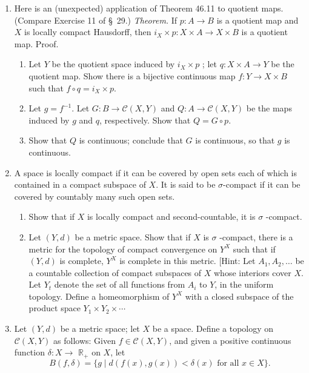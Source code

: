 \begin{enumerate}[itemsep=0.4em, parsep=0pt, topsep=0pt, partopsep=0pt, leftmargin=*, label=\arabic*., ref=\arabic*]
\item Here is an (unexpected) application of Theorem 46.11 to quotient maps. (Compare Exercise 11 of \S\ 29.) \textsl{Theorem.} If \(p : A \rightarrow B\) is a quotient map and \(X\) is locally compact Hausdorff, then \(i_{X} \times p : X \times A \rightarrow X \times B\) is a quotient map. Proof.
 \begin{enumerate}[itemsep=0.2em, parsep=0pt, topsep=0pt, partopsep=0pt, leftmargin=*, label=(\alph*), align=left]
 \item Let \(Y\) be the quotient space induced by \(i_{X} \times p\) ; let \(q : X \times A \rightarrow Y\) be the quotient map. Show there is a bijective continuous map \(f : Y \rightarrow X \times B\) such that \(f \circ q = i_{X} \times p\).
 \item Let \(g = f^{-1}\). Let \(G : B \rightarrow \mathcal{C}({X,Y})\) and \(Q : A \rightarrow \mathcal{C}({X,Y})\) be the maps induced by \(g\) and \(q\), respectively. Show that \(Q = G \circ p\).
 \item Show that \(Q\) is continuous; conclude that \(G\) is continuous, so that \(g\) is continuous.
 \end{enumerate}
\item[*10.] A space is locally compact if it can be covered by open sets each of which is contained in a compact subspace of \(X\). It is said to be \(\sigma\)-compact if it can be covered by countably many such open sets.
 \begin{enumerate}[itemsep=0.2em, parsep=0pt, topsep=0pt, partopsep=0pt, leftmargin=*, label=(\alph*), align=left]
 \item Show that if \(X\) is locally compact and second-countable, it is \(\sigma\) -compact.
 \item Let \((Y, d)\) be a metric space. Show that if \(X\) is \(\sigma\) -compact, there is a metric for the topology of compact convergence on \(Y^{X}\) such that if \((Y, d)\) is complete, \(Y^{X}\) is complete in this metric. [Hint: Let \(A_{1},A_{2},\ldots\) be a countable collection of compact subspaces of \(X\) whose interiors cover \(X\). Let \(Y_{t}\) denote the set of all functions from \(A_{i}\) to \(Y\), in the uniform topology. Define a homeomorphism of \(Y^{X}\) with a closed subspace of the product space \(Y_{1} \times {Y}_{2} \times \cdots\)
 \end{enumerate}
\addtocounter{enumi}{1}%
\item Let \((Y, d)\) be a metric space; let \(X\) be a space. Define a topology on \(\mathcal{C}({X,Y})\) as follows: Given \(f \in \mathcal{C}({X,Y})\), and given a positive continuous function \(\delta : X \rightarrow\) \(\mathbb{R}_{ + }\) on \(X\), let \[ B({f,\delta }) = \{ g \mid d({f(x),g(x) }) < \delta (x) \text{ for all }x \in X\}. \]

\end{enumerate}
